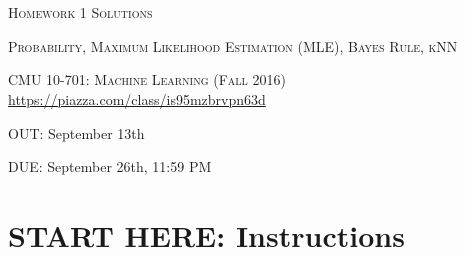 \documentclass{article}
\begin{document}
\section*{}
\begin{center}
  \centerline{\textsc{\LARGE Homework 1{\if{} Solutions \else \fi}}}
  \vspace{0.5em}
  \centerline{\textsc{\Large Probability, Maximum Likelihood Estimation (MLE), Bayes Rule, kNN}}
  \vspace{1em}
  \textsc{\large CMU 10-701: Machine Learning (Fall 2016)} \\
  \url{https://piazza.com/class/is95mzbrvpn63d}
  \centerline{OUT: September 13th}
  \centerline{DUE: September 26th, 11:59 PM}
\end{center}


\section*{START HERE: Instructions}
\end{document}
